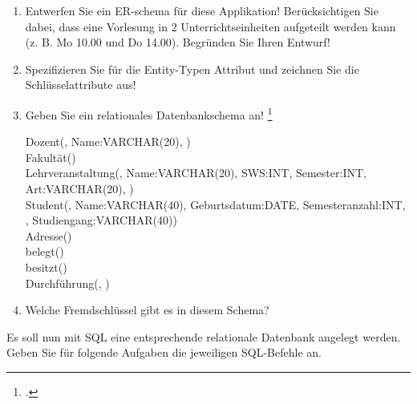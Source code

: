 \documentclass{bschlangaul-aufgabe}
\begin{document}
\begin{enumerate}


\item Entwerfen Sie ein ER-schema für diese Applikation!
Berücksichtigen Sie dabei, dass eine Vorlesung in 2
Unterrichtseinheiten aufgeteilt werden kann (z. B. Mo 10.00 und Do
14.00). Begründen Sie Ihren Entwurf!


\item Spezifizieren Sie für die Entity-Typen Attribut und zeichnen Sie
die Schlüsselattribute aus!


\item Geben Sie ein relationales Datenbankschema an!
\footcite[Uni-ER-Modell, Aufgabe 2]{db:ab:4}

\begin{bAntwort}
\ttfamily
\footnotesize
Dozent(, Name:VARCHAR(20),
)\\

Fakultät()\\

Lehrveranstaltung(, Name:VARCHAR(20), SWS:INT,
Semester:INT, Art:VARCHAR(20), )\\

Student(, Name:VARCHAR(40), Geburtsdatum:DATE,
Semesteranzahl:INT, ,
Studiengang:VARCHAR(40))\\

Adresse()\\

belegt()\\

besitzt()\\

Durchführung(, )\\
\end{bAntwort}

\item Welche Fremdschlüssel gibt es in diesem Schema?
\end{enumerate}

\noindent
Es soll nun mit SQL eine entsprechende relationale Datenbank
angelegt werden. Geben Sie für folgende Aufgaben die jeweiligen
SQL-Befehle an.
\end{document}
